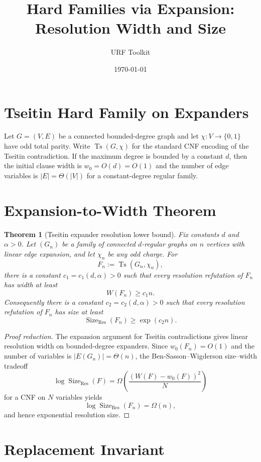\documentclass{article}
\title{Hard Families via Expansion: Resolution Width and Size}
\author{URF Toolkit}
\date{\today}
\newtheorem{theorem}{Theorem}
\begin{document}
\maketitle

\section{Tseitin Hard Family on Expanders}

Let $G=(V,E)$ be a connected bounded-degree graph and let
$\chi:V\to\{0,1\}$ have odd total parity.  Write
$\operatorname{Ts}(G,\chi)$ for the standard CNF encoding of the Tseitin
contradiction.  If the maximum degree is bounded by a constant $d$, then the
initial clause width is $w_0=O(d)=O(1)$ and the number of edge variables is
$|E|=\Theta(|V|)$ for a constant-degree regular family.

\section{Expansion-to-Width Theorem}

\begin{theorem}[Tseitin expander resolution lower bound]
Fix constants $d$ and $\alpha>0$.  Let $(G_n)$ be a family of connected
$d$-regular graphs on $n$ vertices with linear edge expansion, and let
$\chi_n$ be any odd charge.  For
\[
F_n:=\operatorname{Ts}(G_n,\chi_n),
\]
there is a constant $c_1=c_1(d,\alpha)>0$ such that every resolution
refutation of $F_n$ has width at least
\[
W(F_n)\ge c_1 n.
\]
Consequently there is a constant $c_2=c_2(d,\alpha)>0$ such that every
resolution refutation of $F_n$ has size at least
\[
\operatorname{Size}_{\mathrm{Res}}(F_n)
\ge \exp(c_2 n).
\]
\end{theorem}

\begin{proof}[Proof reduction]
The expansion argument for Tseitin contradictions gives linear resolution
width on bounded-degree expanders.  Since $w_0(F_n)=O(1)$ and the number of
variables is $|E(G_n)|=\Theta(n)$, the Ben-Sasson--Wigderson size--width
tradeoff
\[
\log \operatorname{Size}_{\mathrm{Res}}(F)
=\Omega\!\left(
\frac{(W(F)-w_0(F))^2}{N}
\right)
\]
for a CNF on $N$ variables yields
\[
\log \operatorname{Size}_{\mathrm{Res}}(F_n)=\Omega(n),
\]
and hence exponential resolution size.
\end{proof}

\section{Replacement Invariant}
\end{document}
